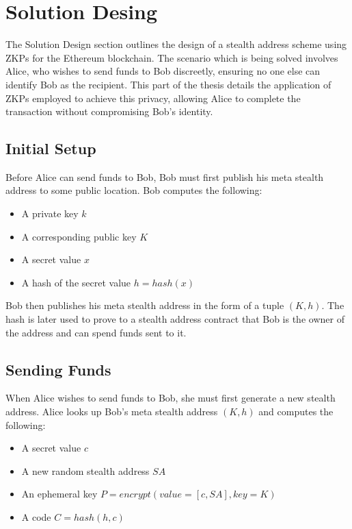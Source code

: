 \chapter{Solution Desing}

The Solution Design section outlines the design of a stealth address
scheme using ZKPs for the Ethereum blockchain. The scenario which is being
solved involves Alice, who wishes to send funds to Bob discreetly, ensuring no
one else can identify Bob as the recipient. This part of the thesis details
the application of ZKPs employed to achieve this privacy, allowing Alice to
complete the transaction without compromising Bob's identity.

\section{Initial Setup}

Before Alice can send funds to Bob, Bob must first publish his meta stealth
address to some public location. Bob computes the following:

\begin{itemize}
	\item A private key $k$
	\item A corresponding public key $K$
	\item A secret value $x$
	\item A hash of the secret value $h = hash(x)$
\end{itemize}

Bob then publishes his meta stealth address in the form of a tuple $(K, h)$.
The hash is later used to prove to a stealth address contract that Bob is the
owner of the address and can spend funds sent to it.

\section{Sending Funds}

When Alice wishes to send funds to Bob, she must first generate a new stealth
address. Alice looks up Bob's meta stealth address $(K, h)$ and computes the
following:

\begin{itemize}
	\item A secret value $c$
	\item A new random stealth address $SA$
	\item An ephemeral key $P = encrypt(value=[c, SA], key=K)$
	\item A code $C = hash(h, c)$
\end{itemize}

